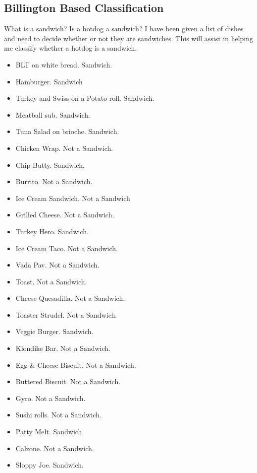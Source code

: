 \documentclass[
	letterpaper, %
]{jdf}
\begin{document}
\subsection{Billington Based Classification}
What is a sandwich? Is a hotdog a sandwich? I have been given a list of dishes and need to decide whether or not they are sandwiches. This will assist in helping me classify whether a hotdog is a sandwich.
\begin{multicols}{2}
\small
\begin{itemize}
    \item BLT on white bread. Sandwich.
    \item Hamburger. Sandwich
    \item Turkey and Swiss on a Potato roll. Sandwich.
    \item Meatball sub. Sandwich.
    \item Tuna Salad on brioche. Sandwich.
    \item Chicken Wrap. Not a Sandwich.
    \item Chip Butty. Sandwich.
    \item Burrito. Not a Sandwich.
    \item Ice Cream Sandwich. Not a Sandwich
    \item Grilled Cheese. Not a Sandwich.
    \item Turkey Hero. Sandwich.
    \item Ice Cream Taco. Not a Sandwich.
    \item Vada Pav. Not a Sandwich.
    \item Toast. Not a Sandwich.
    \item Cheese Quesadilla. Not a Sandwich.
    \item Toaster Strudel. Not a Sandwich.
    \item Veggie Burger. Sandwich.
    \item Klondike Bar. Not a Sandwich.
    \item Egg \& Cheese Biscuit. Not a Sandwich.
    \item Buttered Biscuit. Not a Sandwich.
    \item Gyro. Not a Sandwich.
    \item Sushi rolls. Not a Sandwich.
    \item Patty Melt. Sandwich.
    \item Calzone. Not a Sandwich.
    \item Sloppy Joe. Sandwich.
\end{itemize}
\end{multicols}
\end{document}
